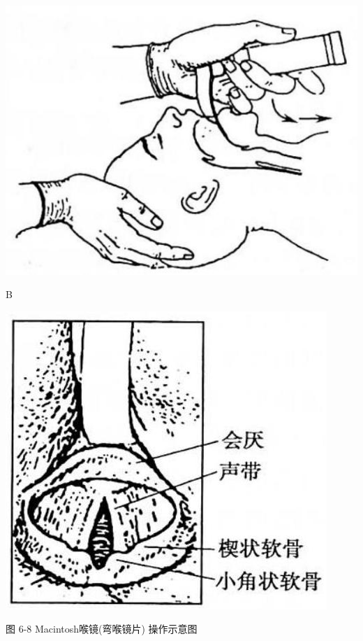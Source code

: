 \documentclass[10pt]{article}
\begin{document}
\begin{center}
\includegraphics[max width=\textwidth]{2024_07_09_002a177993bd97d1d6d7g-090(1)}
\end{center}

B

\begin{center}
\includegraphics[max width=\textwidth]{2024_07_09_002a177993bd97d1d6d7g-090}
\end{center}

图 6-8 Macintosh喉镜(弯喉镜片) 操作示意图
\end{document}
